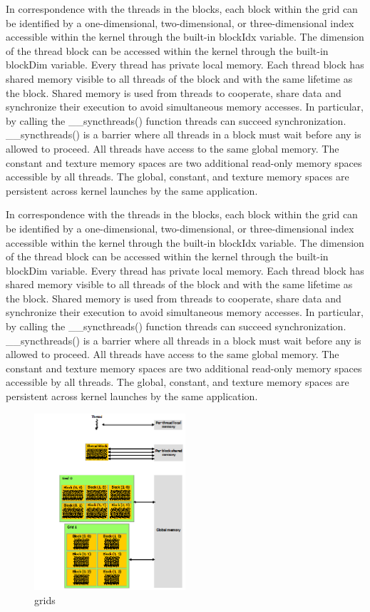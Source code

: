 In correspondence with the threads in the blocks, each block within the grid can be identified by a one-dimensional, two-dimensional, or three-dimensional index accessible within the kernel through the built-in blockIdx variable. The dimension of the thread block can be accessed within the kernel through the built-in blockDim variable. 
Every thread has private local memory. Each thread block has shared memory visible to all threads of the block and with the same lifetime as the block. Shared memory is used from threads to cooperate, share data and synchronize their execution to avoid simultaneous memory accesses. In particular, by calling the \_\_syncthreads() function threads can succeed synchronization.  \_\_syncthreads() is a barrier where all threads in a block must wait before any is allowed to proceed. All threads have access to the same global memory. The constant and texture memory spaces are two additional read-only memory spaces accessible by all threads. The global, constant, and texture memory spaces are persistent across kernel launches by the same application. 


In correspondence with the threads in the blocks, each block within the grid can be identified by a one-dimensional, two-dimensional, or three-dimensional index accessible within the kernel through the built-in blockIdx variable. The dimension of the thread block can be accessed within the kernel through the built-in blockDim variable. Every thread has private local memory. Each thread block has shared memory visible to all threads of the block and with the same lifetime as the block. Shared memory is used from threads to cooperate, share data and synchronize their execution to avoid simultaneous memory accesses. In particular, by calling the \_\_syncthreads() function threads can succeed  synchronization. \_\_syncthreads() is a barrier where all threads in a block must wait before any is allowed to proceed. All threads have access to the same global memory. The constant and texture memory spaces are two additional read-only memory spaces accessible by all threads. The global, constant, and texture memory spaces are persistent across kernel launches by the same application. 

\begin{figure}[h]
   \centering
       \includegraphics[width=0.5\textwidth]{grids}
   \caption{grids}
   \label{fig:grids}
\end{figure}

